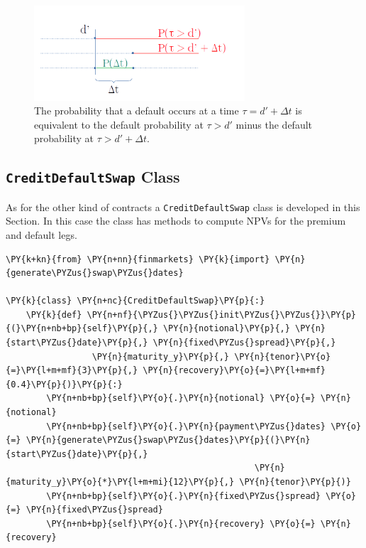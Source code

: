 {\begin{figure}[htb]
	\centering
	\includegraphics[width=0.7\textwidth]{figures/timeline.png}
	\caption{The probability that a default occurs at a time $\tau = d'+\Delta t$ is equivalent to the default probability at $\tau > d'$ minus the default probability at $\tau>d'+\Delta t$.}
	\label{fig:default_p}
\end{figure}

\subsection{\texttt{CreditDefaultSwap} Class}

As for the other kind of contracts a \texttt{CreditDefaultSwap} class is developed in this Section. In this case the class has methods to compute NPVs for the premium and default legs.

\begin{tcolorbox}[breakable, size=fbox, boxrule=1pt, pad at break*=1mm,colback=cellbackground, colframe=cellborder]
\begin{Verbatim}[commandchars=\\\{\}]
\PY{k+kn}{from} \PY{n+nn}{finmarkets} \PY{k}{import} \PY{n}{generate\PYZus{}swap\PYZus{}dates}
        
\PY{k}{class} \PY{n+nc}{CreditDefaultSwap}\PY{p}{:}
    \PY{k}{def} \PY{n+nf}{\PYZus{}\PYZus{}init\PYZus{}\PYZus{}}\PY{p}{(}\PY{n+nb+bp}{self}\PY{p}{,} \PY{n}{notional}\PY{p}{,} \PY{n}{start\PYZus{}date}\PY{p}{,} \PY{n}{fixed\PYZus{}spread}\PY{p}{,} 
                 \PY{n}{maturity_y}\PY{p}{,} \PY{n}{tenor}\PY{o}{=}\PY{l+m+mf}{3}\PY{p}{,} \PY{n}{recovery}\PY{o}{=}\PY{l+m+mf}{0.4}\PY{p}{)}\PY{p}{:}
        \PY{n+nb+bp}{self}\PY{o}{.}\PY{n}{notional} \PY{o}{=} \PY{n}{notional}
        \PY{n+nb+bp}{self}\PY{o}{.}\PY{n}{payment\PYZus{}dates} \PY{o}{=} \PY{n}{generate\PYZus{}swap\PYZus{}dates}\PY{p}{(}\PY{n}{start\PYZus{}date}\PY{p}{,} 
                                                 \PY{n}{maturity_y}\PY{o}{*}\PY{l+m+mi}{12}\PY{p}{,} \PY{n}{tenor}\PY{p}{)}
        \PY{n+nb+bp}{self}\PY{o}{.}\PY{n}{fixed\PYZus{}spread} \PY{o}{=} \PY{n}{fixed\PYZus{}spread}
        \PY{n+nb+bp}{self}\PY{o}{.}\PY{n}{recovery} \PY{o}{=} \PY{n}{recovery}
    

\end{Verbatim}
\end{tcolorbox}}
